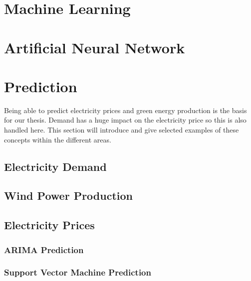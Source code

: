 \documentclass[twoside,11pt,openright]{report}
\begin{document}
\section{Machine Learning}


\newpage
\section{Artificial Neural Network}
\label{sec:annSection}


\newpage
\section{Prediction}
\label{sec:predictionSection}
Being able to predict electricity prices and green energy production is the basis for our thesis. Demand has a huge impact on the electricity price so this is also handled here. This section will introduce and give selected examples of these concepts within the different areas. 

\subsection{Electricity Demand}
\label{sec:ElectricityDemand}


\subsection{Wind Power Production}


\subsection{Electricity Prices}
\label{sec:electriciyPrices}


\subsubsection{ARIMA Prediction}
 
\subsubsection{Support Vector Machine Prediction}


\end{document}

